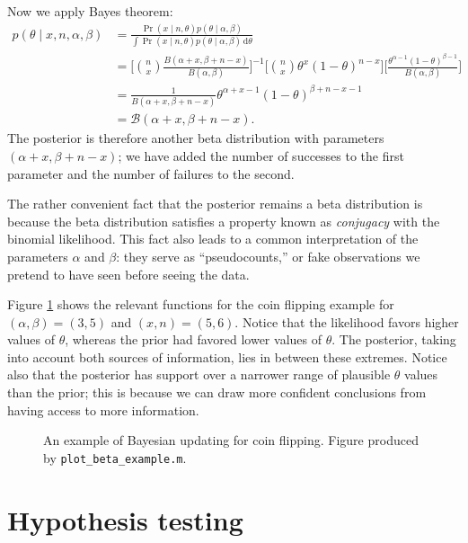 \documentclass{article}
\newcommand{\given}{\mid}
\newcommand{\mc}[1]{\mathcal{#1}}
\newcommand{\intd}[1]{\,\mathrm{d}{#1}}
\newcommand{\inv}{^{-1}}
\begin{document}
Now we apply Bayes theorem:
\begin{align*}
  p(\theta \given x, n, \alpha, \beta)
  &=
  \frac
      {     \Pr(x \given n, \theta) p(\theta \given \alpha, \beta)}
      {\int \Pr(x \given n, \theta) p(\theta \given \alpha, \beta) \intd{\theta}}
  \\
  &=
  \biggl[
    \binom{n}{x}
    \frac{B(\alpha + x, \beta + n - x)}{B(\alpha, \beta)}
  \biggr]\inv
  \biggl[
    \binom{n}{x} \theta^x (1 - \theta)^{n - x}
  \biggr]
  \biggl[
    \frac{\theta^{\alpha - 1}(1 - \theta)^{\beta - 1}}{B(\alpha, \beta)}
  \biggr]
  \\
  &=
  \frac{1}{B(\alpha + x, \beta + n - x)}
  \theta^{\alpha + x - 1}(1 - \theta)^{\beta + n - x - 1}
  \\
  &=
  \mc{B}(\alpha + x, \beta + n - x).
\end{align*}
The posterior is therefore another beta distribution with parameters
$(\alpha + x, \beta + n - x)$; we have added the number of successes
to the first parameter and the number of failures to the second.

The rather convenient fact that the posterior remains a beta
distribution is because the beta distribution satisfies a property
known as \emph{conjugacy} with the binomial likelihood.  This fact
also leads to a common interpretation of the parameters $\alpha$ and
$\beta$: they serve as ``pseudocounts,'' or fake observations we
pretend to have seen before seeing the data.

Figure \ref{coin_flipping} shows the relevant functions for the coin
flipping example for $(\alpha, \beta) = (3, 5)$ and $(x, n) = (5, 6)$.
Notice that the likelihood favors higher values of $\theta$, whereas
the prior had favored lower values of $\theta$.  The posterior, taking
into account both sources of information, lies in between these
extremes.  Notice also that the posterior has support over a narrower
range of plausible $\theta$ values than the prior; this is because we
can draw more confident conclusions from having access to more
information.

\begin{figure}
  \centering
  
  \caption{An example of Bayesian updating for coin flipping.  Figure
    produced by \texttt{plot\_beta\_example.m}.}
  \label{coin_flipping}
\end{figure}

\section*{Hypothesis testing}
\end{document}
